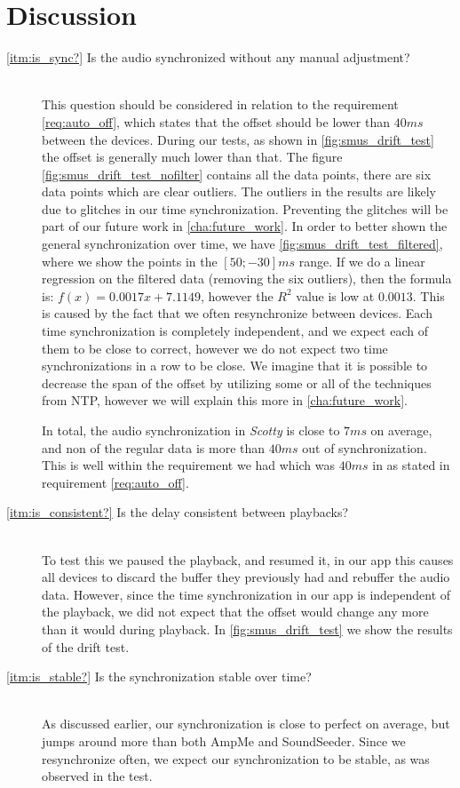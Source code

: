 \section{Discussion}
\begin{description}
    \item[\ref{itm:is_sync?} Is the audio synchronized without any manual adjustment?] \hfill \\
        This question should be considered in relation to the requirement \ref{req:auto_off}, which states that the offset should be lower than $40 ms$ between the devices.
        During our tests, as shown in \vref{fig:smus_drift_test} the offset is generally much lower than that.
        The figure \vref{fig:smus_drift_test_nofilter} contains all the data points, there are six data points which are clear outliers.
        The outliers in the results are likely due to glitches in our time synchronization.
        Preventing the glitches will be part of our future work in \vref{cha:future_work}.
        In order to better shown the general synchronization over time, we have \vref{fig:smus_drift_test_filtered}, where we show the points in the $[50;-30] ms$ range.
        If we do a linear regression on the filtered data (removing the six outliers), then the formula is: $f(x) = 0.0017x + 7.1149$, however the $R^2$ value is low at $0.0013$.
        This is caused by the fact that we often resynchronize between devices.
        Each time synchronization is completely independent, and we expect each of them to be close to correct, however we do not expect two time synchronizations in a row to be close.
        We imagine that it is possible to decrease the span of the offset by utilizing some or all of the techniques from \ac{NTP}, however we will explain this more in \vref{cha:future_work}.

        In total, the audio synchronization in \textit{Scotty} is close to $7 ms$ on average, and non of the regular data is more than $40 ms$ out of synchronization.
        This is well within the requirement we had which was $40 ms$ in as stated in requirement \ref{req:auto_off}.

    \item[\ref{itm:is_consistent?} Is the delay consistent between playbacks?] \hfill \\
        To test this we paused the playback, and resumed it, in our app this causes all devices to discard the buffer they previously had and rebuffer the audio data.
        However, since the time synchronization in our app is independent of the playback, we did not expect that the offset would change any more than it would during playback.
        In \vref{fig:smus_drift_test} we show the results of the drift test.

    \item[\ref{itm:is_stable?} Is the synchronization stable over time?] \hfill \\
        As discussed earlier, our synchronization is close to perfect on average, but jumps around more than both AmpMe and SoundSeeder.
        Since we resynchronize often, we expect our synchronization to be stable, as was observed in the test.
\end{description}
